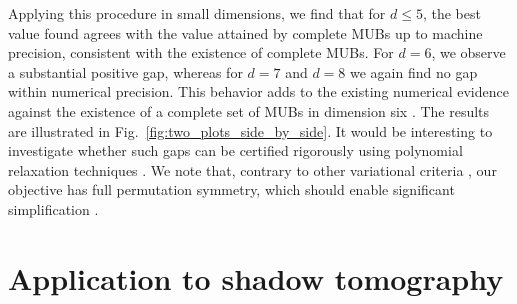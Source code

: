 \documentclass[aps,twocolumn,pra,superscriptaddress,nofootinbib]{revtex4-2}
\begin{document}
Applying this procedure in small dimensions, we find that for $d\leq5$, {the best value found agrees with the value attained by complete MUBs} up to machine precision, consistent with the existence of complete MUBs. For \(d=6\), we observe a substantial positive gap, whereas for $d=7$ and $d=8$ we again find no gap within numerical precision. This behavior adds to the existing numerical evidence against the existence of a complete set of MUBs in dimension six \cite{Durt2010,Brierley2008,Grassl2004,Jaming2010,Gribling2024,Colomer2022,McNulty2024-MUBsRev}. The results are illustrated in Fig.~\ref{fig:two_plots_side_by_side}.
It would be interesting to investigate whether such gaps can be
certified rigorously using polynomial relaxation techniques \cite{Parrilo2003}. We note that, contrary to other variational criteria \cite{Durt2010,Colomer2022}, our objective has full permutation symmetry, which should enable significant simplification \cite{Gatermann2004}.




\section{Application to shadow tomography}
\label{sec:shadow-tomography}
\end{document}
